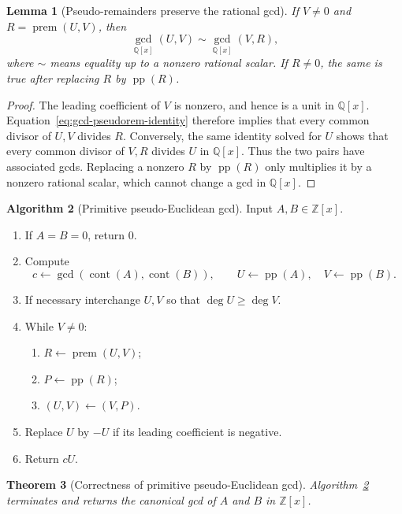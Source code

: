 \documentclass[11pt]{book}
\newtheorem{theorem}{Theorem}[section]
\newtheorem{lemma}[theorem]{Lemma}
\theoremstyle{definition}
\newtheorem{algorithm}[theorem]{Algorithm}
\newcommand{\ZZ}{\mathbb Z}
\begin{document}
\begin{lemma}[Pseudo-remainders preserve the rational gcd]
\label{lem:pseudorem-preserves-gcd}
If $V\ne0$ and $R=\operatorname{prem}(U,V)$, then
\[
 \gcd_{\mathbb Q[x]}(U,V)
 \sim
 \gcd_{\mathbb Q[x]}(V,R),
\]
where $\sim$ means equality up to a nonzero rational scalar.  If $R\ne0$, the
same is true after replacing $R$ by $\operatorname{pp}(R)$.
\end{lemma}

\begin{proof}
The leading coefficient of $V$ is nonzero, and hence is a unit in
$\mathbb Q[x]$.  Equation~\eqref{eq:gcd-pseudorem-identity} therefore implies
that every common divisor of $U,V$ divides $R$.  Conversely, the same identity
solved for $U$ shows that every common divisor of $V,R$ divides $U$ in
$\mathbb Q[x]$.  Thus the two pairs have associated gcds.  Replacing a nonzero
$R$ by $\operatorname{pp}(R)$ only multiplies it by a nonzero rational scalar,
which cannot change a gcd in $\mathbb Q[x]$.
\end{proof}

\begin{algorithm}[Primitive pseudo-Euclidean gcd]
\label{alg:primitive-pseudo-gcd}
Input $A,B\in\ZZ[x]$.
\begin{enumerate}
 \item If $A=B=0$, return $0$.
 \item Compute
 \[
  c\leftarrow\gcd(\operatorname{cont}(A),\operatorname{cont}(B)),
  \qquad
  U\leftarrow\operatorname{pp}(A),
  \quad
  V\leftarrow\operatorname{pp}(B).
 \]
 \item If necessary interchange $U,V$ so that $\deg U\ge\deg V$.
 \item While $V\ne0$:
 \begin{enumerate}
  \item $R\leftarrow\operatorname{prem}(U,V)$;
  \item $P\leftarrow\operatorname{pp}(R)$;
  \item $(U,V)\leftarrow(V,P)$.
 \end{enumerate}
 \item Replace $U$ by $-U$ if its leading coefficient is negative.
 \item Return $cU$.
\end{enumerate}
\end{algorithm}

\begin{theorem}[Correctness of primitive pseudo-Euclidean gcd]
\label{thm:primitive-pseudo-gcd-correct}
Algorithm~\ref{alg:primitive-pseudo-gcd} terminates and returns the canonical
gcd of $A$ and $B$ in $\ZZ[x]$.
\end{theorem}
\end{document}
